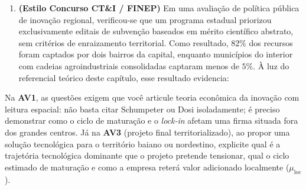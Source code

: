 \begin{enumerate}[leftmargin=1.6em, itemsep=8pt]
  \item \textbf{(Estilo Concurso CT\&I / FINEP)} Em uma avaliação de política pública de inovação regional, verificou-se que um programa estadual priorizou exclusivamente editais de subvenção baseados em mérito científico abstrato, sem critérios de enraizamento territorial. Como resultado, $82\%$ dos recursos foram captados por dois bairros da capital, enquanto municípios do interior com cadeias agroindustriais consolidadas captaram menos de $5\%$. À luz do referencial teórico deste capítulo, esse resultado evidencia:
\end{enumerate}

\begin{boxDica}
Na \textbf{AV1}, as questões exigem que você articule teoria econômica da inovação com leitura espacial: não basta citar Schumpeter ou Dosi isoladamente; é preciso demonstrar como o ciclo de maturação e o \textit{lock-in} afetam uma firma situada fora dos grandes centros. Já na \textbf{AV3} (projeto final territorializado), ao propor uma solução tecnológica para o território baiano ou nordestino, explicite qual é a trajetória tecnológica dominante que o projeto pretende tensionar, qual o ciclo estimado de maturação e como a empresa reterá valor adicionado localmente ($\mu_{\text{loc}}$).
\end{boxDica}

\clearpage
{}

